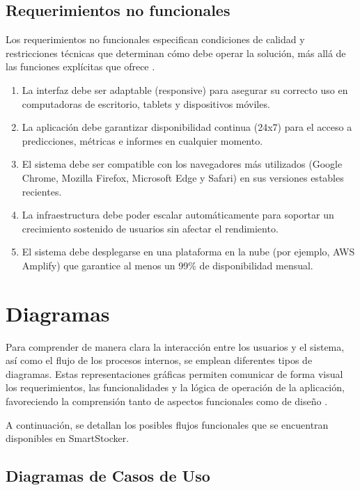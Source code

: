 \subsection{Requerimientos no funcionales}\label{sec:requerimientos-no-funcionales}
Los requerimientos no funcionales especifican condiciones de calidad y restricciones técnicas que determinan cómo debe operar la solución, más allá de las funciones explícitas que ofrece \parencite{ieee2008}.
\begin{enumerate}[label=\textbf{RNF\arabic*}, leftmargin=2.8cm]
    \item La interfaz debe ser adaptable (responsive) para asegurar su correcto uso en computadoras de escritorio, tablets y dispositivos móviles.
    \item La aplicación debe garantizar disponibilidad continua (24x7) para el acceso a predicciones, métricas e informes en cualquier momento.
    \item El sistema debe ser compatible con los navegadores más utilizados (Google Chrome, Mozilla Firefox, Microsoft Edge y Safari) en sus versiones estables recientes.
    \item La infraestructura debe poder escalar automáticamente para soportar un crecimiento sostenido de usuarios sin afectar el rendimiento.
    \item El sistema debe desplegarse en una plataforma en la nube (por ejemplo, AWS Amplify) que garantice al menos un 99\% de disponibilidad mensual.
\end{enumerate}

\section{Diagramas}\label{sec:diagramas}

Para comprender de manera clara la interacción entre los usuarios y el sistema, así como el flujo de los procesos internos, se emplean diferentes tipos de diagramas. Estas representaciones gráficas permiten comunicar de forma visual los requerimientos, las funcionalidades y la lógica de operación de la aplicación, favoreciendo la comprensión tanto de aspectos funcionales como de diseño \parencite{booch2005uml}. 

A continuación, se detallan los posibles flujos funcionales que se encuentran disponibles en SmartStocker.

\subsection{Diagramas de Casos de Uso}\label{sec:diagramas-casos-uso}

